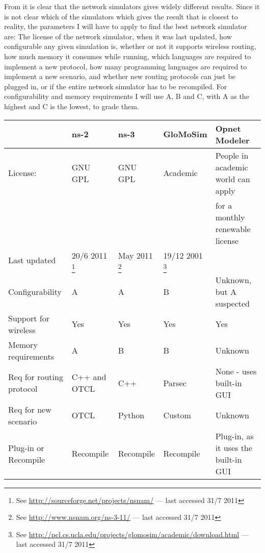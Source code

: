 From \cite{MANcom} it is clear that the network simulators gives widely different results. Since it is not clear which of the simulators which gives the result that is closest to reality, the parameters I will have to apply to find the best network simulator are: The license of the network simulator, when it was last updated, how configurable any given simulation is, whether or not it supports wireless routing, how much memory it consumes while running, which languages are required to implement a new protocol, how many programming languages are required to implement a new scenario, and whether new routing protocols can just be plugged in, or if the entire network simulator has to be recompiled. For configurability and memory requirements I will use A, B and C, with A as the highest and C is the lowest, to grade them.\\
\begin{scriptsize}
\begin{minipage}{15.0cm}
\begin{tabular}[4]{lllll}
                          & ns-2      & ns-3      & GloMoSim & Opnet Modeler \\
\hline
License:                  & GNU GPL   & GNU GPL   & Academic & People in academic world can apply\\        &           &           &          & for a monthly renewable license \\
Last updated              & 20/6 2011
\footnote{\scriptsize{See \url{http://sourceforge.net/projects/nsnam/} --- last accessed 31/7 2011}} & May 2011
\footnote{\scriptsize{See \url{http://www.nsnam.org/ns-3-11/} --- last accessed 31/7 2011}} & 19/12 2001
\footnote{\scriptsize{See \url{http://pcl.cs.ucla.edu/projects/glomosim/academic/download.html} --- last accessed 31/7 2011}}  & \\
Configurability           & A         & A         & B         & Unknown, but A suspected\\
Support for wireless      & Yes       & Yes       & Yes       & Yes \\
Memory requirements       & A         & B         & B         & Unknown\\
Req for routing protocol  & C++ and OTCL & C++    & Parsec    & None - uses built-in GUI\\
Req for new scenario      & OTCL      & Python    & Custom    & Unknown \\
Plug-in or Recompile      & Recompile & Recompile & Recompile & Plug-in, as it uses the built-in GUI
\end{tabular}
\end{minipage}
\end{scriptsize}

